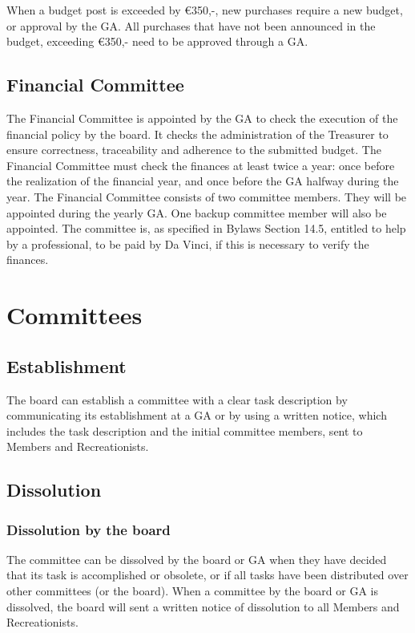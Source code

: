 \documentclass[a4paper]{article}
\newcommand{\Asta}{Bylaws} %
\begin{document}
When a budget post is exceeded by €350,-, new purchases require a new budget, or approval by the { GA}. All purchases that have not been announced in the budget, exceeding €350,- need to be approved through a { GA}.

\subsection{Financial Committee}
The Financial Committee is appointed by the { GA} to check the execution of the financial policy by the board. It checks the administration of the Treasurer to ensure correctness, traceability and adherence to the submitted budget. The Financial Committee must check the finances at least twice a year: once before the realization of the financial year, and once before the { GA} halfway during the year. The Financial Committee consists of two committee members. They will be appointed during the yearly { GA}. One backup committee member will also be appointed. The committee is, as specified in { \Asta} Section 14.5, entitled to help by a professional, to be paid by Da Vinci, if this is necessary to verify the finances.

\section{Committees}
\subsection{Establishment}
The board can establish a committee with a clear task description by communicating its establishment at a { GA} or by using a written notice, which includes the task description and the initial committee members, sent to { Members} and { Recreationists}.

\subsection{Dissolution}
\subsubsection{Dissolution by the board}
The committee can be dissolved by the board or { GA} when they have decided that its task is accomplished or obsolete, or if all tasks have been distributed over other committees (or the board). When a committee by the board or { GA} is dissolved, the board will sent a written notice of dissolution to all { Members} and { Recreationists}.
\end{document}

